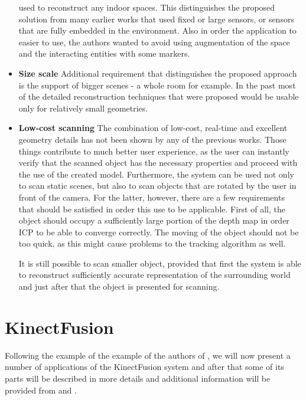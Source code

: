 \documentclass[12pt]{article}
\theoremstyle{plain}
\begin{document}
\begin{itemize}
      used to reconstruct any indoor spaces. This distinguishes the proposed
      solution from many earlier works that used fixed or large sensors, or
      sensors that are fully embedded in the environment. Also in order the
      application to easier to use, the authors wanted to avoid using
      augmentation of the space and the interacting entities with some markers.
    \item \textbf{Size scale} Additional requirement that distinguishes the
      proposed approach is the support of bigger scenes - a whole room for
      example. In the past most of the detailed reconstruction techniques that
      were proposed would be usable only for relatively small geometries.
    \item \textbf{Low-cost scanning} The combination of low-cost, real-time and
      excellent geometry details has not been shown by any of the previous
      works. Those things contribute to much better user experience, as the user
      can instantly verify that the scanned object has the necessary properties
      and proceed with the use of the created model. Furthermore, the system can
      be used not only to scan static scenes, but also to scan objects that are
      rotated by the user in front of the camera. For the latter, however, there
      are a few requirements that should be satisfied in order this use to be
      applicable. First of all, the object should occupy a sufficiently large
      portion of the depth map in order ICP to be able to converge correctly.
      The moving of the object should not be too quick, as this might cause
      problems to the tracking algorithm as well.

      It is still possible to scan smaller object, provided that first the
      system is able to reconstruct sufficiently accurate representation of the
      surrounding world and just after that the object is presented for
      scanning.
  \end{itemize}

\section{KinectFusion} %
\label{sec:KinectFusion}
  Following the example of the example of the authors of \cite{kinectfusion}, we
  will now present a number of applications of the KinectFusion system and after
  that some of its parts will be described in more details and additional
  information will be provided from
  \cite{representaion-and-rendering-of-implicit-surfaces} and \cite{icp}.
\end{document}
